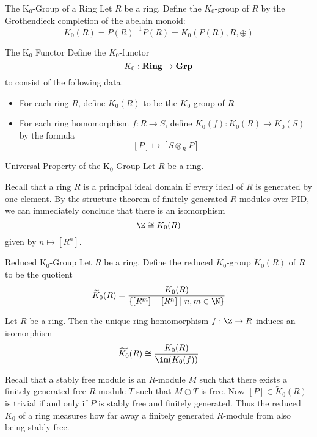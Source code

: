 \documentclass[a4paper]{article}
\begin{document}
\begin{defn}{The K${_0}$-Group of a Ring}{} Let $R$ be a ring. Define the $K_0$-group of $R$ by the Grothendieck completion of the abelain monoid: $$K_0(R)=P(R)^{-1}P(R)=K_0(P(R),R,\oplus)$$
\end{defn}

\begin{defn}{The K${_0}$ Functor}{} Define the $K_0$-functor $$K_0:\bold{Ring}\to\bold{Grp}$$ to consist of the following data. 
\begin{itemize}
\item For each ring $R$, define $K_0(R)$ to be the $K_0$-group of $R$
\item For each ring homomorphism $f:R\to S$, define $K_0(f):K_0(R)\to K_0(S)$ by the formula $$[P]\mapsto[S\otimes_RP]$$
\end{itemize}
\end{defn}

\begin{thm}{Universal Property of the K${_0}$-Group}{} Let $R$ be a ring. 
\end{thm}

Recall that a ring $R$ is a principal ideal domain if every ideal of $R$ is generated by one element. By the structure theorem of finitely generated $R$-modules over PID, we can immediately conclude that there is an isomorphism $$\Z\cong K_0(R)$$ given by $n\mapsto[R^n]$. 

\begin{defn}{Reduced K${_0}$-Group}{} Let $R$ be a ring. Define the reduced $K_0$-group $\widetilde{K}_0(R)$ of $R$ to be the quotient $$\widetilde{K}_0(R)=\frac{K_0(R)}{\{[R^m]-[R^n]\;|\;n,m\in\N\}}$$
\end{defn}

\begin{lmm}{}{} Let $R$ be a ring. Then the unique ring homomorphism $f:\Z\to R$ induces an isomorphism $$\widetilde{K_0}(R)\cong\frac{K_0(R)}{\im(K_0(f))}$$
\end{lmm}

Recall that a stably free module is an $R$-module $M$ such that there exists a finitely generated free $R$-module $T$ such that $M\oplus T$ is free. Now $[P]\in\widetilde{K}_0(R)$ is trivial if and only if $P$ is stably free and finitely generated. Thus the reduced $K_0$ of a ring measures how far away a finitely generated $R$-module from also being stably free. 
\end{document}
